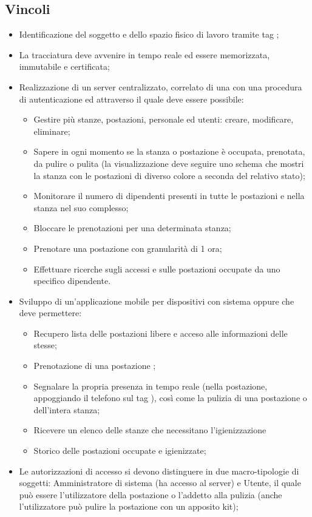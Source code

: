 \subsection{Vincoli}
\begin{itemize}
\item Identificazione del soggetto e dello spazio fisico di lavoro tramite tag ;
\item La tracciatura deve avvenire in tempo reale ed essere memorizzata, immutabile e certificata;
\item Realizzazione di un server centralizzato, correlato di una  con una procedura di autenticazione ed attraverso il quale deve essere possibile:
\begin{itemize}
\item Gestire più stanze, postazioni, personale ed utenti: creare, modificare, eliminare;
\item Sapere in ogni momento se la stanza o postazione è occupata, prenotata, da pulire o pulita (la visualizzazione deve seguire uno schema che mostri la stanza con le postazioni di diverso colore a seconda del relativo stato);
\item Monitorare il numero di dipendenti presenti in tutte le postazioni e nella stanza nel suo complesso;
\item Bloccare le prenotazioni per una determinata stanza;
\item Prenotare una postazione con granularità di 1 ora;
\item Effettuare ricerche sugli accessi e sulle postazioni occupate da uno specifico dipendente.
\end{itemize}
\item Sviluppo di un'applicazione mobile per dispositivi con sistema  oppure  che deve permettere:
\begin{itemize}
\item Recupero lista delle postazioni libere e acceso alle informazioni delle stesse;
\item Prenotazione di una postazione ;
\item Segnalare la propria presenza in tempo reale (nella postazione, appoggiando il telefono sul tag ), così come la pulizia di una postazione o dell'intera stanza;
\item Ricevere  un  elenco  delle  stanze  che  necessitano l’igienizzazione
\item Storico delle postazioni occupate e igienizzate;
\end{itemize}
\item Le autorizzazioni di accesso si devono distinguere in due macro-tipologie di soggetti: Amministratore di sistema (ha accesso al server) e Utente, il quale può essere l'utilizzatore della postazione o l'addetto alla pulizia (anche l'utilizzatore può pulire la postazione con un apposito kit);

\end{itemize}
